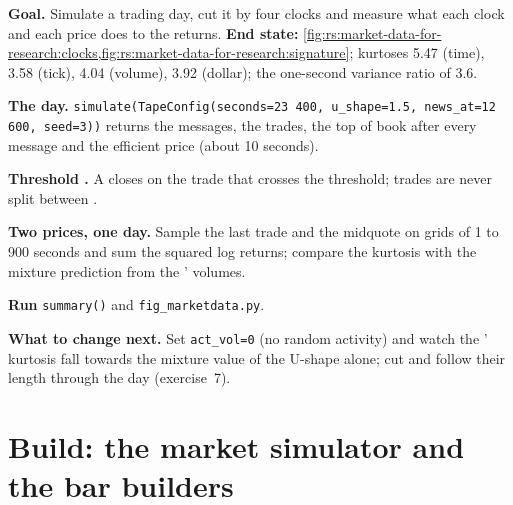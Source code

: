 \begin{tutorial}
\textbf{Goal.} Simulate a trading day, cut it by four clocks and measure what each clock and each price does to the returns.
\textbf{End state:} \cref{fig:rs:market-data-for-research:clocks,fig:rs:market-data-for-research:signature}; kurtoses 5.47 (time),
3.58 (tick), 4.04 (volume), 3.92 (dollar); the one-second variance ratio of 3.6.
\begin{tutsteps}
\item \textbf{The day.} \texttt{simulate(TapeConfig(seconds=23\,400, u\_shape=1.5, news\_at=12\,600, seed=3))} returns the
messages, the trades, the top of book after every message and the efficient price (about 10 seconds).
\item \textbf{Threshold .} A  closes on the trade that crosses the threshold; trades are never split between .
\label{lst:rs:market-data-for-research:cuts}
\item \textbf{Two prices, one day.} Sample the last trade and the midquote on grids of 1 to 900 seconds and sum the squared
log returns; compare the kurtosis with the mixture prediction from the ' volumes.
\label{lst:rs:market-data-for-research:rv}
\item \textbf{Run} \texttt{summary()} and \texttt{fig\_marketdata.py}.
\end{tutsteps}
\textbf{What to change next.} Set \texttt{act\_vol=0} (no random activity) and watch the ' kurtosis fall towards the
mixture value of the U-shape alone; cut  and follow their length through the day (exercise~7).
\end{tutorial}

\section{Build: the market simulator and the bar builders}\label{bld:rs:market-data-for-research:tape}

